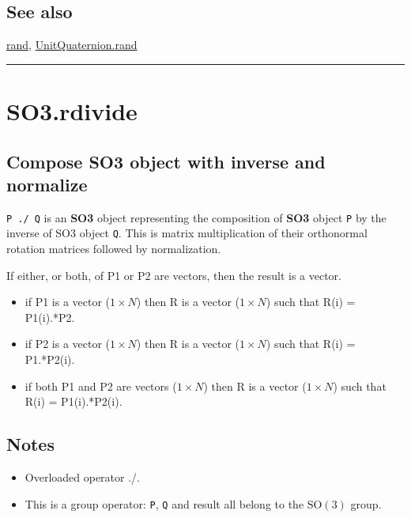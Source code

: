 \subsection*{See also}


\hyperlink{rand}{\color{blue} rand}, \hyperlink{UnitQuaternion.rand}{\color{blue} UnitQuaternion.rand}

\vspace{1.5ex}\hrule

\hypertarget{SO3.rdivide}{\section*{SO3.rdivide}}
\subsection*{Compose SO3 object with inverse and normalize}


\texttt{P ./ Q} is an \textbf{\color{red} SO3} object representing the composition of \textbf{\color{red} SO3} object \texttt{P} by the
inverse of SO3 object \texttt{Q}. This is matrix multiplication
of their orthonormal rotation matrices followed by normalization.



If either, or both, of P1 or P2 are vectors, then the result is a vector.

\begin{itemize}
  \item if P1 is a vector ($1 \times N$) then R is a vector ($1 \times N$) such that R(i) = P1(i).*P2.
  \item if P2 is a vector ($1 \times N$) then R is a vector ($1 \times N$) such that R(i) = P1.*P2(i).
  \item if both P1 and P2 are vectors ($1 \times N$) then R is a vector ($1 \times N$) such     that R(i) = P1(i).*P2(i).
\end{itemize}

\subsection*{Notes}
\begin{itemize}
  \item Overloaded operator \textquotesingle ./\textquotesingle .
  \item This is a group operator: \texttt{P}, \texttt{Q} and result all belong to the $\mbox{SO}(3)$ group.
\end{itemize}

